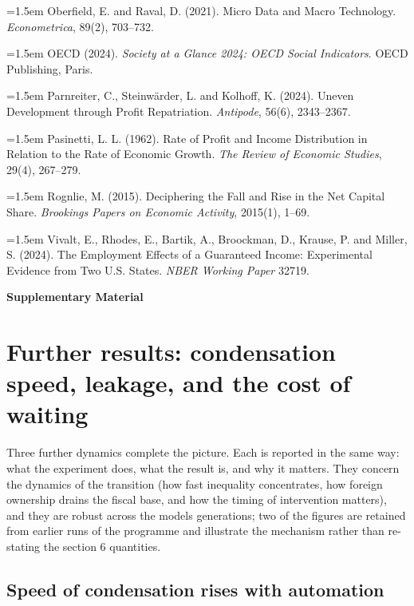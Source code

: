 \documentclass[12pt]{article}
\begin{document}
\hangindent=1.5em Oberfield, E. and Raval, D. (2021). Micro Data and Macro Technology. \textit{Econometrica}, 89(2), 703--732.\par\addvspace{0.45em}
\hangindent=1.5em OECD (2024). \textit{Society at a Glance 2024: OECD Social Indicators}. OECD Publishing, Paris.\par\addvspace{0.45em}
\hangindent=1.5em Parnreiter, C., Steinwärder, L. and Kolhoff, K. (2024). Uneven Development through Profit Repatriation. \textit{Antipode}, 56(6), 2343--2367.\par\addvspace{0.45em}
\hangindent=1.5em Pasinetti, L. L. (1962). Rate of Profit and Income Distribution in Relation to the Rate of Economic Growth. \textit{The Review of Economic Studies}, 29(4), 267--279.\par\addvspace{0.45em}
\hangindent=1.5em Rognlie, M. (2015). Deciphering the Fall and Rise in the Net Capital Share. \textit{Brookings Papers on Economic Activity}, 2015(1), 1--69.\par\addvspace{0.45em}
\hangindent=1.5em Vivalt, E., Rhodes, E., Bartik, A., Broockman, D., Krause, P. and Miller, S. (2024). The Employment Effects of a Guaranteed Income: Experimental Evidence from Two U.S. States. \textit{NBER Working Paper} 32719.\par\addvspace{0.45em}
\endgroup\normalsize


\clearpage
\appendix
\renewcommand{\thesection}{S\arabic{section}}
\setcounter{section}{0}
\begin{center}\large\textbf{Supplementary Material}\end{center}
\addtocounter{section}{0}
\section{Further results: condensation speed, leakage, and the cost of waiting}


Three further dynamics complete the picture. Each is reported in the
same way: what the experiment does, what the result is, and why it
matters. They concern the dynamics of the transition (how fast
inequality concentrates, how foreign ownership drains the fiscal base,
and how the timing of intervention matters), and they are robust across
the model\textquotesingle s generations; two of the figures are retained
from earlier runs of the programme and illustrate the mechanism rather
than re-stating the section 6 quantities.

\hypertarget{speed-of-condensation-rises-with-automation}{%
\subsection{Speed of condensation rises with
automation}\label{speed-of-condensation-rises-with-automation}}
\end{document}

